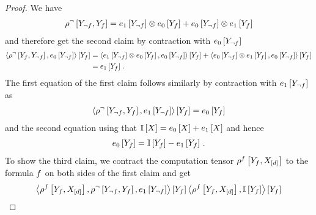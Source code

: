 \begin{proof}
    We have
    \begin{align*}
        \rho^{\lnot}\left[Y_{\lnot f},Y_{f}\right]
        = e_1\left[Y_{\lnot f}\right] \otimes e_0\left[Y_{f}\right]
        +e_0\left[Y_{\lnot f}\right] \otimes e_1\left[Y_{f}\right]
    \end{align*}
    and therefore get the second claim by contraction with $e_0\left[Y_{\lnot f}\right]$
    \begin{align*}
        \left\langle 
            \rho^{\lnot}\left[Y_{f},Y_{\lnot f}\right],e_0\left[Y_{\lnot f}\right]
        \right\rangle \left[ Y_{f} \right]
        &=  \left\langle 
            e_1\left[Y_{\lnot f}\right] \otimes e_0\left[Y_{f}\right],e_0\left[Y_{\lnot f}\right]
        \right\rangle \left[ Y_{f} \right]
        +  \left\langle 
            e_0\left[Y_{\lnot f}\right] \otimes e_1\left[Y_{f}\right],e_0\left[Y_{\lnot f}\right]
        \right\rangle \left[ Y_{f} \right]
        \\
        &= e_1\left[Y_{f}\right] \, .
    \end{align*}
    The first equation of the first claim follows similarly by contraction with $e_1\left[Y_{\lnot f}\right]$ as
    \begin{align*}
        \left\langle 
            \rho^{\lnot}\left[Y_{\lnot f},Y_{f}\right],e_1\left[Y_{\lnot f}\right]
        \right\rangle \left[ Y_{f} \right]
        = e_0\left[Y_{f}\right]
    \end{align*}
    and the second equation using that $\mathbb{I}\left[X\right]=e_0\left[X\right]+e_1\left[X\right]$ and hence
    \begin{align*}
        e_0\left[Y_{f}\right] =  \mathbb{I}\left[Y_{f}\right] - e_1\left[Y_{f}\right] \, .
    \end{align*}
    To show the third claim, we contract the computation tensor $\rho^{f}\left[Y_{f},X_{[d]}\right]$ to the formula $f$ on both sides of the first claim and get
    \begin{align*}
        \sbcontractionof{
            \rencodingofat{\exformula}{\formulavar,\shortcatvariables},\rencodingofat{\lnot}{\headvariableof{\lnot\exformula},\formulavar},\tbasisat{\headvariableof{\lnot\exformula}}
        }{\formulavar}
        \contractionof{\rencodingofat{\exformula}{\formulavar,\shortcatvariables},\onesat{\formulavar}}{\formulavar}

\end{align*}
\end{proof}
